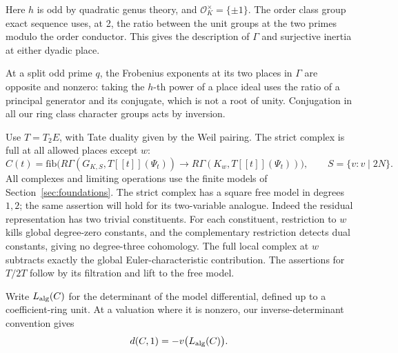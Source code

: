 Here \(h\) is odd by quadratic genus theory, and \(\mathcal O_K^\times=\{\pm1\}\). The order class group exact sequence uses, at 2, the ratio between the unit groups at the two primes modulo the order conductor. This gives the description of \(\Gamma\) and surjective inertia at either dyadic place. 

At a split odd prime \(q\), the Frobenius exponents at its two places in \(\Gamma\) are opposite and nonzero: taking the \(h\)-th power of a place ideal uses the ratio of a principal generator and its conjugate, which is not a root of unity. Conjugation in all our ring class character groups acts by inversion.

Use \(T=T_2E\), with Tate duality given by the Weil pairing.  The strict
complex is full at all allowed places except \(w\):
\[
 C(t)=\mathrm{fib}\big(R\Gamma(G_{K,S},T[[t]](\Psi_t))
                        \longrightarrow R\Gamma(K_w,T[[t]](\Psi_t))\big),
 \qquad S=\{v:v\mid 2N\}.
\]
All complexes and limiting operations use the finite models of
Section~\ref{sec:foundations}.  The strict complex has a square free model in
degrees \(1,2\); the same assertion will hold for its two-variable analogue.
Indeed the residual representation has two trivial constituents.  For each
constituent, restriction to \(w\) kills global degree-zero constants, and
the complementary restriction detects dual constants, giving no degree-three
cohomology.  The full local complex at \(w\) subtracts exactly the global
Euler-characteristic contribution.  The assertions for \(T/2T\) follow by
its filtration and lift to the free model.

Write \(L_{\rm alg}(C)\) for the determinant of the model differential, defined
up to a coefficient-ring unit.  At a valuation where it is nonzero, our
inverse-determinant convention gives
\[
 d(C,1)=-v\bigl(L_{\rm alg}(C)\bigr).
\]

